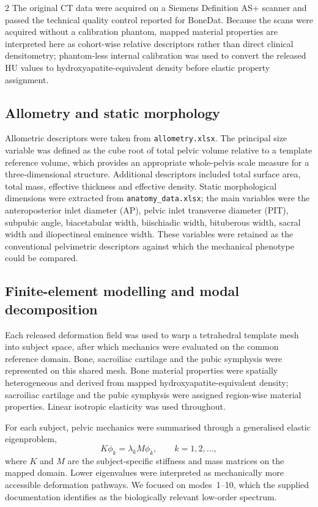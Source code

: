 \documentclass[openacc]{rsproca_new}
\begin{document}
\begin{multicols}{2}
The original CT data were acquired on a Siemens Definition AS+ scanner and passed the technical quality control reported for BoneDat. Because the scans were acquired without a calibration phantom, mapped material properties are interpreted here as cohort-wise relative descriptors rather than direct clinical densitometry; phantom-less internal calibration was used to convert the released HU values to hydroxyapatite-equivalent density before elastic property assignment.

\subsection{Allometry and static morphology}

Allometric descriptors were taken from \texttt{allometry.xlsx}. The principal size variable was defined as the cube root of total pelvic volume relative to a template reference volume, which provides an appropriate whole-pelvis scale measure for a three-dimensional structure. Additional descriptors included total surface area, total mass, effective thickness and effective density. Static morphological dimensions were extracted from \texttt{anatomy\_data.xlsx}; the main variables were the anteroposterior inlet diameter (AP), pelvic inlet transverse diameter (PIT), subpubic angle, biacetabular width, biischiadic width, bituberous width, sacral width and iliopectineal eminence width. These variables were retained as the conventional pelvimetric descriptors against which the mechanical phenotype could be compared.

\subsection{Finite-element modelling and modal decomposition}

Each released deformation field was used to warp a tetrahedral template mesh into subject space, after which mechanics were evaluated on the common reference domain. Bone, sacroiliac cartilage and the pubic symphysis were represented on this shared mesh. Bone material properties were spatially heterogeneous and derived from mapped hydroxyapatite-equivalent density; sacroiliac cartilage and the pubic symphysis were assigned region-wise material properties. Linear isotropic elasticity was used throughout.

For each subject, pelvic mechanics were summarised through a generalised elastic eigenproblem,
\begin{equation}
K\phi_{k} = \lambda_{k} M\phi_{k}, \qquad k=1,2,\ldots,
\end{equation}
where $K$ and $M$ are the subject-specific stiffness and mass matrices on the mapped domain. Lower eigenvalues were interpreted as mechanically more accessible deformation pathways. We focused on modes~1--10, which the supplied documentation identifies as the biologically relevant low-order spectrum.


\end{multicols}
\end{document}
